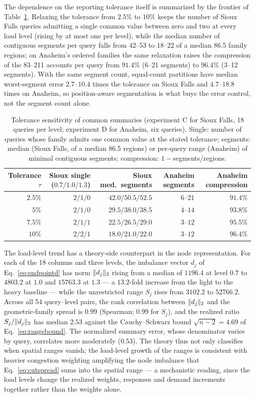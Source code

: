 The dependence on the reporting tolerance itself is summarized by the
frontier of Table~\ref{tab:tolerance}. Relaxing the tolerance from
$2.5\%$ to $10\%$ keeps the number of Sioux Falls queries admitting a
single common value between zero and two at every load level (rising
by at most one per level), while the median number of contiguous
segments per query falls from 42--53
to 18--22 of a median 86.5 family regions; on Anaheim's ordered
families the same relaxation raises the compression of the 83--211
accounts per query from $91.4\%$ (6--21 segments) to $96.4\%$
(3--12 segments). With the same segment count, equal-count partitions
have median worst-segment error $2.7$--$10.4$ times the tolerance on
Sioux Falls and $4.7$--$18.8$ times on Anaheim, so position-aware
segmentation is what buys the error control, not the segment count
alone.
\begin{table}[t]\centering\small
\caption{Tolerance sensitivity of common summaries (experiment C for
Sioux Falls, 18 queries per level; experiment D for Anaheim, six
queries). Single: number of queries whose family admits one common
value at the stated tolerance; segments: median (Sioux Falls, of a
median 86.5 regions) or per-query range (Anaheim) of minimal contiguous
segments; compression: $1-$segments/regions.}\label{tab:tolerance}
\begin{tabular}{rrrrr}\toprule
Tolerance $\tau$ & Sioux single ($0.7/1.0/1.3$) & Sioux med.\ segments & Anaheim segments & Anaheim compression\\\midrule
$2.5\%$ & $2/1/0$ & $42.0/50.5/52.5$ & $6$--$21$ & $91.4\%$\\
$5\%$ & $2/1/0$ & $29.5/38.0/38.5$ & $4$--$14$ & $93.8\%$\\
$7.5\%$ & $2/1/1$ & $22.5/26.5/29.0$ & $3$--$12$ & $95.5\%$\\
$10\%$ & $2/2/1$ & $18.0/21.0/22.0$ & $3$--$12$ & $96.4\%$\\
\bottomrule\end{tabular}\end{table}

The load-level trend has a theory-side counterpart in the node
representation. For each of the 18 columns and three levels, the
imbalance vector $d_j$ of Eq.~\eqref{eq:endpointd} has norm
$\lVert d_j \rVert_2$ rising from a median of $1196.4$ at level $0.7$ to
$4803.2$ at $1.0$ and $15763.3$ at $1.3$ --- a $13.2$-fold increase
from the light to the heavy baseline --- while the unrestricted range
$S_j$ rises from $3102.2$ to $52766.2$. Across all 54 query--level
pairs, the rank correlation between $\lVert d_j \rVert_2$ and the
geometric-family spread is $0.99$ (Spearman; $0.99$ for $S_j$), and the
realized ratio $S_j/\lVert d_j \rVert_2$ has median $2.53$ against the
Cauchy--Schwarz bound $\sqrt{n-2}=4.69$ of Eq.~\eqref{eq:rangebound}.
The normalized summary error, whose denominator varies by query,
correlates more moderately ($0.53$). The theory thus not only classifies
when spatial ranges vanish; the load-level growth of the ranges is
consistent with heavier congestion weighting amplifying the node
imbalance that Eq.~\eqref{eq:cutspread} sums into the spatial range ---
a mechanistic reading, since the load levels change the realized
weights, responses and demand increments together rather than the
weights alone.

